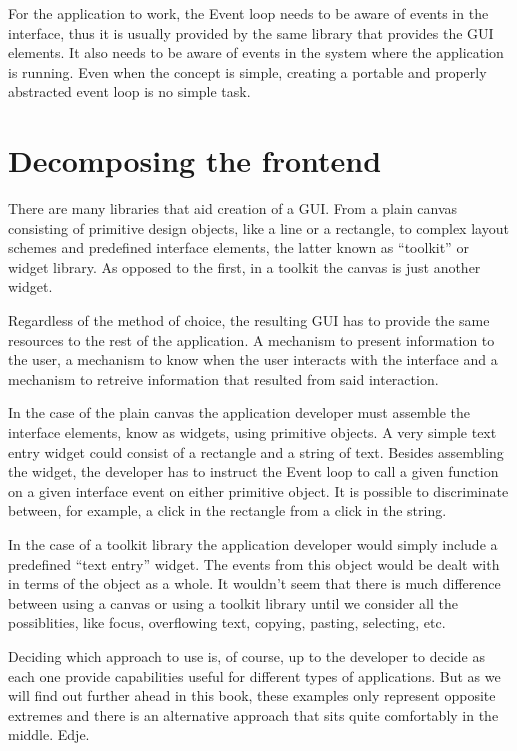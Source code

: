 \documentclass[12pt,a4paper,english]{book}
\begin{document}
For the application to work, the Event loop needs to be aware of events in the
interface, thus it is  usually provided by the same library that provides the
GUI elements. It also needs to be aware of events in the system where the
application is running. Even when the concept is simple, creating a portable
and properly abstracted event loop is no simple task.



\hypertarget{decomposing-the-frontend}{}
\section{Decomposing the frontend}
\label{decomposing-the-frontend}

There are many libraries that aid creation of a GUI. From a plain canvas
consisting of primitive design objects, like a line or a rectangle, to complex
layout schemes and predefined interface elements, the latter known as ``toolkit''
or widget library. As opposed to the first, in a toolkit the canvas is just
another widget.

Regardless of the method of choice, the resulting GUI has to provide the same
resources to the rest of the application. A mechanism to present information
to the user, a mechanism to know when the user interacts with the interface and
a mechanism to retreive information that resulted from said interaction.

In the case of the plain canvas the application developer must assemble the
interface elements, know as widgets, using primitive objects. A very simple
text entry widget could consist of a rectangle and a string of text. Besides
assembling the widget, the developer has to instruct the Event loop  to call a
given function on a given interface event on either primitive object. It is
possible to discriminate between, for example, a click in the rectangle from a
click in the string.

In the case of a toolkit library the application developer would simply include
a predefined ``text entry'' widget. The events from this object would be dealt
with in terms of the object as a whole. It wouldn't seem that there is much
difference between using a canvas or using a toolkit library until we consider
all the possiblities, like focus, overflowing text, copying, pasting,
selecting, etc.

Deciding which approach to use is, of course, up to the developer to decide as
each one provide capabilities useful for different types of applications. But
as we will find out further ahead in this book, these examples only represent
opposite extremes and there is an alternative approach that sits quite
comfortably in the middle. Edje.
\end{document}

